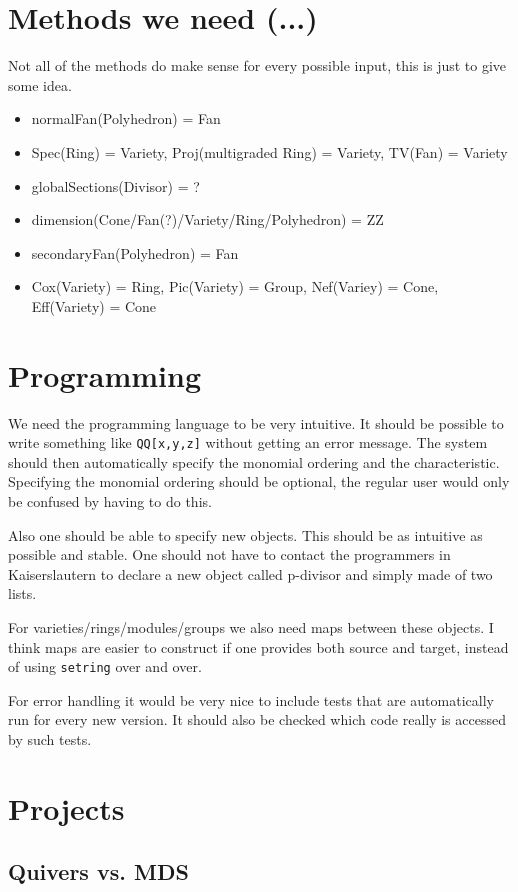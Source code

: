 \documentclass[a4paper]{article}
\begin{document}
\section{Methods we need (...)}
Not all of the methods do make sense for every possible input, this is just to give some idea.
\begin{itemize}
\item normalFan(Polyhedron) = Fan
\item Spec(Ring) = Variety, Proj(multigraded Ring) = Variety, TV(Fan) = Variety
\item globalSections(Divisor) = ?
\item dimension(Cone/Fan(?)/Variety/Ring/Polyhedron) = ZZ
\item secondaryFan(Polyhedron) = Fan
\item Cox(Variety) = Ring, Pic(Variety) = Group, Nef(Variey) = Cone, Eff(Variety) = Cone
\end{itemize}

\section{Programming}
We need the programming language to be very intuitive.
It should be possible to write something like
{\tt QQ[x,y,z]} without getting an error message. The system should then automatically specify the monomial ordering and the characteristic.
Specifying the monomial ordering should be optional, the regular user would only be confused by having to do this.

Also one should be able to specify new objects. This should be as intuitive as possible and stable. One should not have to contact the programmers in Kaiserslautern to declare a new object called p-divisor and simply made of two lists.

For varieties/rings/modules/groups we also need maps between these objects. I think maps are easier to construct if one provides both source and target, instead of using {\tt setring} over and over.

For error handling it would be very nice to include tests that are automatically run for every new version. It should also be checked which code really is accessed by such tests.
\section{Projects}

\subsection{Quivers vs. MDS}
\end{document}

